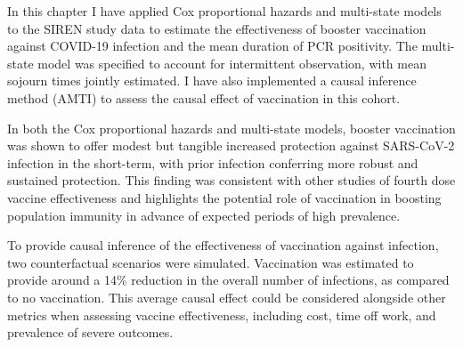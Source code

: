 In this chapter I have applied Cox proportional hazards and multi-state models to the SIREN study data to estimate the effectiveness of booster vaccination against COVID-19 infection and the mean duration of PCR positivity. The multi-state model was specified to account for intermittent observation, with mean sojourn times jointly estimated. I have also implemented a causal inference method (AMTI) to assess the causal effect of vaccination in this cohort.

In both the Cox proportional hazards and multi-state models, booster vaccination was shown to offer modest but tangible increased protection against SARS-CoV-2 infection in the short-term, with prior infection conferring more robust and sustained protection. This finding was consistent with other studies of fourth dose vaccine effectiveness and highlights the potential role of vaccination in boosting population immunity in advance of expected periods of high prevalence.

To provide causal inference of the effectiveness of vaccination against infection, two counterfactual scenarios were simulated. Vaccination was estimated to provide around a 14\% reduction in the overall number of infections, as compared to no vaccination. This average causal effect could be considered alongside other metrics when assessing vaccine effectiveness, including cost, time off work, and prevalence of severe outcomes.
